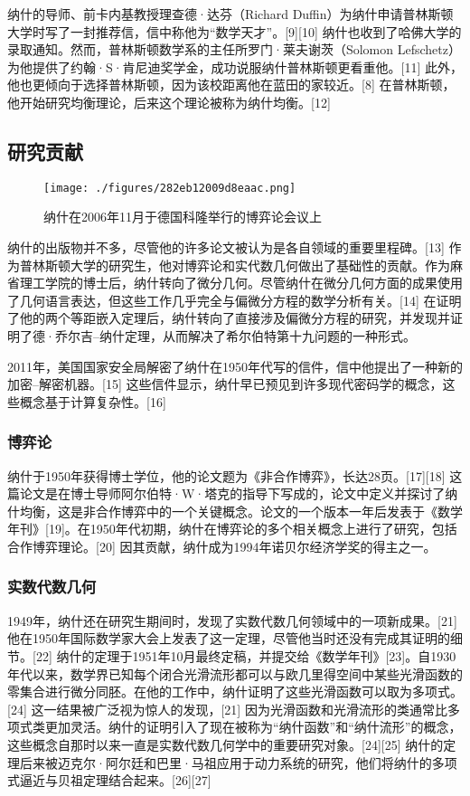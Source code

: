 纳什的导师、前卡内基教授理查德·达芬（Richard Duffin）为纳什申请普林斯顿大学时写了一封推荐信，信中称他为“数学天才”。[9][10] 纳什也收到了哈佛大学的录取通知。然而，普林斯顿数学系的主任所罗门·莱夫谢茨（Solomon Lefschetz）为他提供了约翰·S·肯尼迪奖学金，成功说服纳什普林斯顿更看重他。[11] 此外，他也更倾向于选择普林斯顿，因为该校距离他在蓝田的家较近。[8] 在普林斯顿，他开始研究均衡理论，后来这个理论被称为纳什均衡。[12]
\subsection{研究贡献}
\begin{figure}[ht]
\centering
\texttt{[image: ./figures/282eb12009d8eaac.png]}
\caption{纳什在2006年11月于德国科隆举行的博弈论会议上} \label{fig_JFNJY_2}
\end{figure}
纳什的出版物并不多，尽管他的许多论文被认为是各自领域的重要里程碑。[13] 作为普林斯顿大学的研究生，他对博弈论和实代数几何做出了基础性的贡献。作为麻省理工学院的博士后，纳什转向了微分几何。尽管纳什在微分几何方面的成果使用了几何语言表达，但这些工作几乎完全与偏微分方程的数学分析有关。[14] 在证明了他的两个等距嵌入定理后，纳什转向了直接涉及偏微分方程的研究，并发现并证明了德·乔尔吉–纳什定理，从而解决了希尔伯特第十九问题的一种形式。

2011年，美国国家安全局解密了纳什在1950年代写的信件，信中他提出了一种新的加密–解密机器。[15] 这些信件显示，纳什早已预见到许多现代密码学的概念，这些概念基于计算复杂性。[16]
\subsubsection{博弈论}  
纳什于1950年获得博士学位，他的论文题为《非合作博弈》，长达28页。[17][18] 这篇论文是在博士导师阿尔伯特·W·塔克的指导下写成的，论文中定义并探讨了纳什均衡，这是非合作博弈中的一个关键概念。论文的一个版本一年后发表于《数学年刊》[19]。在1950年代初期，纳什在博弈论的多个相关概念上进行了研究，包括合作博弈理论。[20] 因其贡献，纳什成为1994年诺贝尔经济学奖的得主之一。
\subsubsection{实数代数几何}  
1949年，纳什还在研究生期间时，发现了实数代数几何领域中的一项新成果。[21] 他在1950年国际数学家大会上发表了这一定理，尽管他当时还没有完成其证明的细节。[22] 纳什的定理于1951年10月最终定稿，并提交给《数学年刊》[23]。自1930年代以来，数学界已知每个闭合光滑流形都可以与欧几里得空间中某些光滑函数的零集合进行微分同胚。在他的工作中，纳什证明了这些光滑函数可以取为多项式。[24] 这一结果被广泛视为惊人的发现，[21] 因为光滑函数和光滑流形的类通常比多项式类更加灵活。纳什的证明引入了现在被称为“纳什函数”和“纳什流形”的概念，这些概念自那时以来一直是实数代数几何学中的重要研究对象。[24][25] 纳什的定理后来被迈克尔·阿尔廷和巴里·马祖应用于动力系统的研究，他们将纳什的多项式逼近与贝祖定理结合起来。[26][27]
